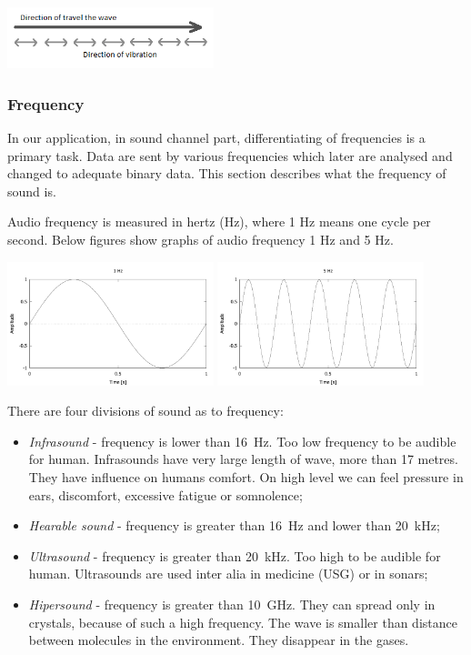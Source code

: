 \documentclass[11pt,titlepage]{article}
\theoremstyle{plain}
\begin{document}
\begin{center}
		\includegraphics[width=0.45\textwidth]{img/longitudinal_wave}
\end{center}
\subsubsection{Frequency}
In our application, in sound channel part, differentiating of frequencies is a primary task. Data are sent by various frequencies which later are analysed and changed to adequate binary data. This section describes what the frequency of sound is.

\vspace{5mm}

Audio frequency is measured in hertz (Hz), where 1 Hz means one cycle per second. Below figures show graphs of audio frequency 1 Hz and 5 Hz.


\begin{center}
	\includegraphics[width=0.45\textwidth]{img/frequency_1Hz}
	\includegraphics[width=0.45\textwidth]{img/frequency_5Hz}
\end{center}

There are four divisions of sound as to frequency:
\begin{itemize}
	\item \textit{Infrasound} - frequency is lower than 16~Hz. Too low frequency to be audible for human. Infrasounds have very large length of wave, more than 17 metres. They have influence on humans comfort. On high level we can feel pressure in ears, discomfort, excessive fatigue or somnolence;
	\item \textit{Hearable sound} - frequency is greater than 16~Hz and lower than 20~kHz;
	\item \textit{Ultrasound} - frequency is greater than 20~kHz. Too high to be audible for human. Ultrasounds are used inter alia in medicine (USG) or in sonars;
	\item \textit{Hipersound} - frequency is greater than 10~GHz. They can spread only in crystals, because of such a high frequency. The wave is smaller than distance between molecules in the environment. They disappear in the gases.
\end{itemize}
\end{document}
